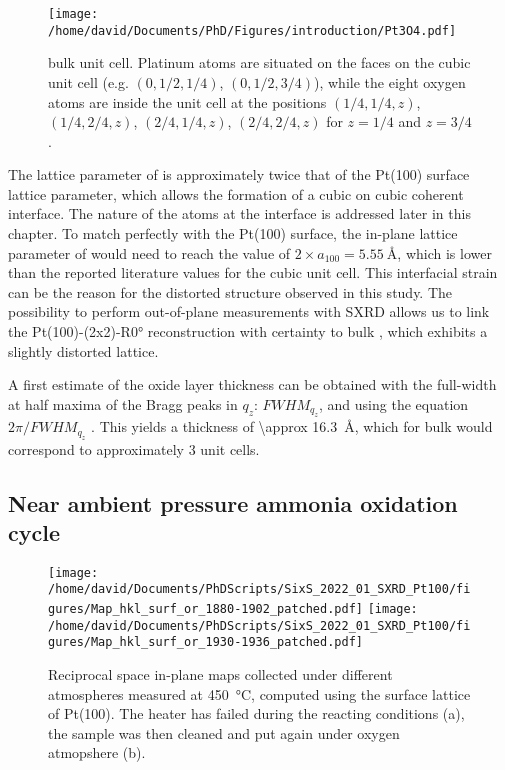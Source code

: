 \begin{SCfigure}
    \centering
    \texttt{[image: /home/david/Documents/PhD/Figures/introduction/Pt3O4.pdf]}
    \caption{
         bulk unit cell.
        Platinum atoms are situated on the faces on the cubic unit cell (e.g. $(0, 1/2, 1/4)$, $(0, 1/2, 3/4)$), while the eight oxygen atoms are inside the unit cell at the positions $(1/4, 1/4, z)$, $(1/4, 2/4, z)$, $(2/4, 1/4, z)$, $(2/4, 2/4, z)$ for $z=1/4$ and $z=3/4$.
    }
    \label{fig:Pt3O4}
\end{SCfigure}

The lattice parameter of  is approximately twice that of the Pt(100) surface lattice parameter, which allows the formation of a cubic on cubic coherent interface.
The nature of the atoms at the interface is addressed later in this chapter.
To match perfectly with the Pt(100) surface, the in-plane lattice parameter of  would need to reach the value of $2\times a_{100} =\qty{5.55}{\angstrom}$, which is lower than the reported literature values for the cubic unit cell.
This interfacial strain can be the reason for the distorted structure observed in this study.
The possibility to perform out-of-plane measurements with SXRD allows us to link the Pt(100)-(2x2)-R\ang{0} reconstruction with certainty to bulk , which exhibits a slightly distorted lattice.

A first estimate of the oxide layer thickness can be obtained with the full-width at half maxima of the Bragg peaks in $q_z$: $FWHM_{q_z}$, and using the equation $2\pi/FWHM_{q_z}$ \parencite{Patterson1939, Warren1990}.
This yields a thickness of \qty{\approx 16.3}{\angstrom}, which for bulk  would correspond to approximately \num{3} unit cells.

\subsection{Near ambient pressure ammonia oxidation cycle}

\begin{figure}[!htb]
    \centering
    \texttt{[image: /home/david/Documents/PhDScripts/SixS\_2022\_01\_SXRD\_Pt100/figures/Map\_hkl\_surf\_or\_1880-1902\_patched.pdf]}
    \texttt{[image: /home/david/Documents/PhDScripts/SixS\_2022\_01\_SXRD\_Pt100/figures/Map\_hkl\_surf\_or\_1930-1936\_patched.pdf]}
    \caption{
        Reciprocal space in-plane maps collected under different atmospheres measured at \qty{450}{\degreeCelsius}, computed using the surface lattice of Pt(100).
        The heater has failed during the reacting conditions (a), the sample was then cleaned and put again under oxygen atmopshere (b).
    }
    \label{fig:MapsPt100B}
\end{figure}

